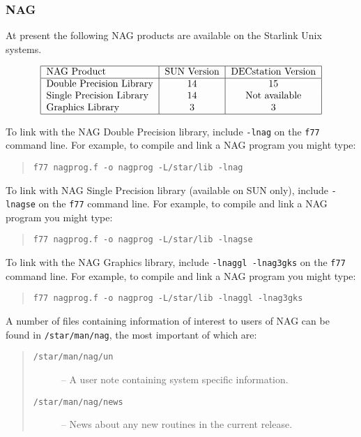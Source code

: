 \subsubsection{NAG}

At present the following NAG products are available on the Starlink Unix 
systems. 


\begin{table}[htb]\caption{NAG packages available on Unix}\label{NAG libraries}
\[\begin{tabular}{|l|c|c|}
\hline
NAG Product & SUN Version & DECstation Version\\
\hline
Double Precision Library & 14 & 15 \\
Single Precision Library & 14 & Not available \\
Graphics Library         & 3  & 3  \\
\hline
\end{tabular}\]
\end{table}

To link with the NAG Double Precision library, include {\tt -lnag}
on the {\tt f77} command line. For example, to compile and link a NAG program
you might type:
\begin{quote}
{\tt f77 nagprog.f -o nagprog -L/star/lib -lnag }
\end{quote}

To link with NAG Single Precision library (available on SUN only), 
include {\tt -lnagse}
on the {\tt f77} command line. For example, to compile and link a NAG program
you might type:
\begin{quote}
{\tt f77 nagprog.f -o nagprog -L/star/lib -lnagse }
\end{quote}

To link with the NAG Graphics library,
include {\tt -lnaggl -lnag3gks}
on the {\tt f77} command line. For example, to compile and link a NAG program
you might type:
\begin{quote}
{\tt f77 nagprog.f -o nagprog -L/star/lib -lnaggl -lnag3gks }
\end{quote}

A number of files containing information of interest to users of NAG can be
found in {\tt /star\-/man\-/nag}, the most important of which are:
\begin{quote}
\begin{description}
\item[\tt /star/man/nag/un] -- A user note containing system specific information.
\item[\tt /star/man/nag/news] -- News about any new routines in the current release.
\end{description}
\end{quote}

